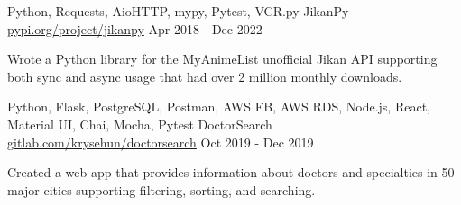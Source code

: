 

\begin{cventries}

  \cventry
  {Python, Requests, AioHTTP, mypy, Pytest, VCR.py} %
  {JikanPy} %
  {\href{https://pypi.org/project/jikanpy/}{pypi.org/project/jikanpy}} %
  {Apr 2018 - Dec 2022} %
  {
    \begin{cvitems} %
      \item {Wrote a Python library for the MyAnimeList unofficial Jikan API supporting both sync and async usage that had over 2 million monthly downloads.}
    \end{cvitems}
  }

  \cventry
  {Python, Flask, PostgreSQL, Postman, AWS EB, AWS RDS, Node.js, React, Material UI, Chai, Mocha, Pytest} %
  {DoctorSearch} %
  {\href{https://gitlab.com/krysehun/doctorsearch}{gitlab.com/krysehun/doctorsearch}} %
  {Oct 2019 - Dec 2019} %
  {
    \begin{cvitems} %
      \item {Created a web app that provides information about doctors and specialties in 50 major cities supporting filtering, sorting, and searching.}
    \end{cvitems}
  }

\end{cventries}
